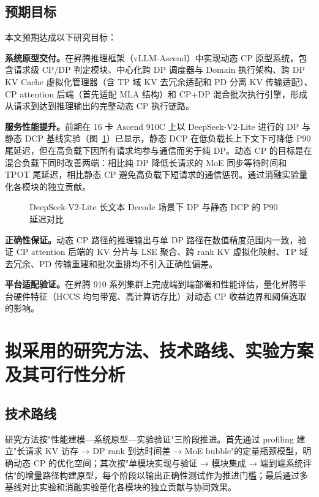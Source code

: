 \subsection{预期目标}

本文预期达成以下研究目标：

\textbf{系统原型交付。}在昇腾推理框架（vLLM-Ascend）中实现动态 CP 原型系统，包含请求级 CP/DP 判定模块、中心化跨 DP 调度器与 Domain 执行架构、跨 DP KV Cache 虚拟化管理器（含 TP 域 KV 去冗余适配和 PD 分离 KV 传输适配）、CP attention 后端（首先适配 MLA 结构）和 CP+DP 混合批次执行引擎，形成从请求到达到推理输出的完整动态 CP 执行链路。

\textbf{服务性能提升。}前期在 16 卡 Ascend 910C 上以 DeepSeek-V2-Lite 进行的 DP 与静态 DCP 基线实验（图~\ref{fig:dp-dcp-long-context}）已显示，静态 DCP 在低负载长上下文下可降低 P90 尾延迟，但在高负载下因所有请求均参与通信而劣于纯 DP。动态 CP 的目标是在混合负载下同时改善两端：相比纯 DP 降低长请求的 MoE 同步等待时间和 TPOT 尾延迟，相比静态 CP 避免高负载下短请求的通信惩罚。通过消融实验量化各模块的独立贡献。

\begin{figure}[htbp]
    \centering
    \resizebox{0.98\textwidth}{!}{}
    \caption{DeepSeek-V2-Lite 长文本 Decode 场景下 DP 与静态 DCP 的 P90 延迟对比}
    \label{fig:dp-dcp-long-context}
\end{figure}

\textbf{正确性保证。}动态 CP 路径的推理输出与单 DP 路径在数值精度范围内一致，验证 CP attention 后端的 KV 分片与 LSE 聚合、跨 rank KV 虚拟化映射、TP 域去冗余、PD 传输重建和批次重排均不引入正确性偏差。

\textbf{平台适配验证。}在昇腾 910 系列集群上完成端到端部署和性能评估，量化昇腾平台硬件特征（HCCS 均匀带宽、高计算访存比）对动态 CP 收益边界和阈值选取的影响。

\section{拟采用的研究方法、技术路线、实验方案及其可行性分析}

\subsection{技术路线}

研究方法按"性能建模—系统原型—实验验证"三阶段推进。首先通过 profiling 建立"长请求 KV 访存 → DP rank 到达时间差 → MoE bubble"的定量瓶颈模型，明确动态 CP 的优化空间；其次按"单模块实现与验证 → 模块集成 → 端到端系统评估"的增量路径构建原型，每个阶段以输出正确性测试作为推进门槛；最后通过多基线对比实验和消融实验量化各模块的独立贡献与协同效果。

